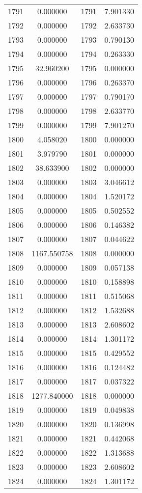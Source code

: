 \documentclass[12pt]{article}
\begin{document}
\begin{longtable}{@{}cccc@{}}
1791 & 0.000000 & 1791 & 7.901330 \\
1792 & 0.000000 & 1792 & 2.633730 \\
1793 & 0.000000 & 1793 & 0.790130 \\
1794 & 0.000000 & 1794 & 0.263330 \\
1795 & 32.960200 & 1795 & 0.000000 \\
1796 & 0.000000 & 1796 & 0.263370 \\
1797 & 0.000000 & 1797 & 0.790170 \\
1798 & 0.000000 & 1798 & 2.633770 \\
1799 & 0.000000 & 1799 & 7.901270 \\
1800 & 4.058020 & 1800 & 0.000000 \\
1801 & 3.979790 & 1801 & 0.000000 \\
1802 & 38.633900 & 1802 & 0.000000 \\
1803 & 0.000000 & 1803 & 3.046612 \\
1804 & 0.000000 & 1804 & 1.520172 \\
1805 & 0.000000 & 1805 & 0.502552 \\
1806 & 0.000000 & 1806 & 0.146382 \\
1807 & 0.000000 & 1807 & 0.044622 \\
1808 & 1167.550758 & 1808 & 0.000000 \\
1809 & 0.000000 & 1809 & 0.057138 \\
1810 & 0.000000 & 1810 & 0.158898 \\
1811 & 0.000000 & 1811 & 0.515068 \\
1812 & 0.000000 & 1812 & 1.532688 \\
1813 & 0.000000 & 1813 & 2.608602 \\
1814 & 0.000000 & 1814 & 1.301172 \\
1815 & 0.000000 & 1815 & 0.429552 \\
1816 & 0.000000 & 1816 & 0.124482 \\
1817 & 0.000000 & 1817 & 0.037322 \\
1818 & 1277.840000 & 1818 & 0.000000 \\
1819 & 0.000000 & 1819 & 0.049838 \\
1820 & 0.000000 & 1820 & 0.136998 \\
1821 & 0.000000 & 1821 & 0.442068 \\
1822 & 0.000000 & 1822 & 1.313688 \\
1823 & 0.000000 & 1823 & 2.608602 \\
1824 & 0.000000 & 1824 & 1.301172 \\

\end{longtable}
\end{document}
